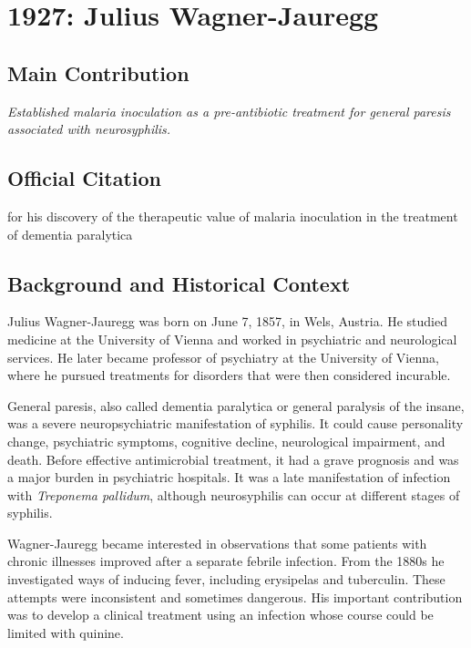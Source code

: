 \chapter[1927 --- Wagner-Jauregg]{1927: Julius Wagner-Jauregg}
\label{ch:1927_juliuswagnerjauregg}

\section*{Main Contribution}

\textit{Established malaria inoculation as a pre-antibiotic treatment for general paresis associated with neurosyphilis.}\cite{nobel-1927,lecture-1927}

\section{Official Citation}

for his discovery of the therapeutic value of malaria inoculation in the treatment of dementia paralytica\cite{nobel-1927}

\section{Background and Historical Context}

Julius Wagner-Jauregg was born on June 7, 1857, in Wels, Austria. He studied medicine at the University of Vienna and worked in psychiatric and neurological services. He later became professor of psychiatry at the University of Vienna, where he pursued treatments for disorders that were then considered incurable.

General paresis, also called dementia paralytica or general paralysis of the insane, was a severe neuropsychiatric manifestation of syphilis. It could cause personality change, psychiatric symptoms, cognitive decline, neurological impairment, and death. Before effective antimicrobial treatment, it had a grave prognosis and was a major burden in psychiatric hospitals. It was a late manifestation of infection with \emph{Treponema pallidum}, although neurosyphilis can occur at different stages of syphilis.

Wagner-Jauregg became interested in observations that some patients with chronic illnesses improved after a separate febrile infection. From the 1880s he investigated ways of inducing fever, including erysipelas and tuberculin. These attempts were inconsistent and sometimes dangerous. His important contribution was to develop a clinical treatment using an infection whose course could be limited with quinine.

